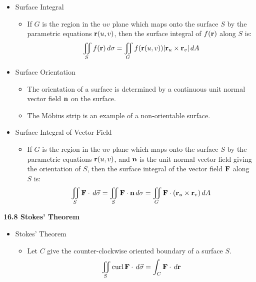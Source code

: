   \begin{itemize}

    \item Surface Integral
      \begin{itemize}
        \item If $G$ is the region in the $uv$ plane which maps onto the surface $S$ by the parametric equations $\mathbf{r}(u,v)$, then the surface integral of $f(\mathbf{r})$ along $S$ is:
          \[
            \iint_S f(\mathbf{r})\,d{\sigma} = \iint_G f(\mathbf{r}(u,v))|\mathbf{r}_u\times\mathbf{r}_v|\,d{A}
          \]
      \end{itemize}

    \item Surface Orientation
      \begin{itemize}
        \item The orientation of a surface is determined by a continuous unit normal vector field $\mathbf{n}$ on the surface.
        \item The M\"obius strip is an example of a non-orientable surface.
      \end{itemize}

    \item Surface Integral of Vector Field
      \begin{itemize}
        \item If $G$ is the region in the $uv$ plane which maps onto the surface $S$ by the parametric equations $\mathbf{r}(u,v)$, and $\mathbf{n}$ is the unit normal vector field giving the orientation of $S$, then the surface integral of the vector field $\mathbf{F}$ along $S$ is:
          \[
            \iint_S \mathbf{F}\cdot\,d{\vec\sigma} = \iint_S \mathbf{F}\cdot\mathbf{n}\,d{\sigma} = \iint_G \mathbf{F}\cdot(\mathbf{r}_u\times\mathbf{r}_v)\,d{A}
          \]
      \end{itemize}
  \end{itemize}

\newpage

\centerline{\bf 16.8 Stokes' Theorem}
  \begin{itemize}
  \item Stokes' Theorem
    \begin{itemize}
    \item Let $C$ give the counter-clockwise oriented boundary of a surface $S$.
    \[
      \iint_S \textrm{curl}\,\mathbf{F}\cdot\,d{\vec\sigma} = \int_C \mathbf{F}\cdot\,d{\mathbf{r}}
    \]
    \end{itemize}
  \end{itemize}

